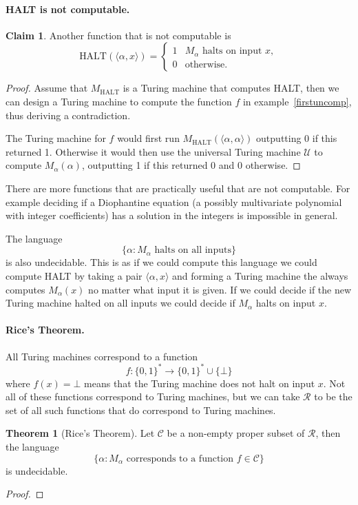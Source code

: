 \documentclass[11pt,a4paper]{article}
\theoremstyle{definition}
\newtheorem{thm}{Theorem}
\newtheorem{claim}{Claim}
\newcommand{\U}{\mathcal{U}}
\begin{document}
\paragraph{HALT is not computable.}
\begin{claim}
Another function that is not computable is
\[
\text{HALT}(\langle \alpha,x\rangle) =\begin{cases}
1 & M_\alpha \text{ halts on input }x,\\
0 &\text{otherwise}.
\end{cases}
\]
\end{claim}
\begin{proof}
Assume that $M_{\text{HALT}}$ is a Turing machine that computes HALT, then we can design a Turing machine to compute the function $f$ in example~\ref{firstuncomp}, thus deriving a contradiction.

The Turing machine for $f$ would first run $M_{\text{HALT}}(\langle \alpha,\alpha\rangle)$ outputting 0 if this returned 1.
Otherwise it would then use the universal Turing machine $\U$ to compute $M_\alpha (\alpha)$, outputting 1 if this returned 0 and 0 otherwise.
\end{proof}

There are more functions that are practically useful that are not computable.
For example deciding if a Diophantine equation (a possibly multivariate polynomial with integer coefficients) has a solution in the integers is impossible in general.

The language
\[
\{\alpha : M_{\alpha} \text{ halts on all inputs}\}
\]
is also undecidable.
This is as if we could compute this language we could compute HALT by taking a pair $\langle \alpha,x\rangle$ and forming a Turing machine the always computes $M_\alpha(x)$ no matter what input it is given.
If we could decide if the new Turing machine halted on all inputs we could decide if $M_\alpha$ halts on input $x$.

\paragraph{Rice's Theorem.}
All Turing machines correspond to a function
\[
f\colon\{0,1\}^*\to\{0,1\}^*\cup\{\bot\}
\]
where $f(x) = \bot$ means that the Turing machine does not halt on input $x$.
Not all of these functions correspond to Turing machines, but we can take $\mathcal{R}$ to be the set of all such functions that do correspond to Turing machines.

\begin{thm}[Rice's Theorem]
Let $\mathcal{C}$ be a non-empty proper subset of $\mathcal{R}$, then the language
\[
\{\alpha : M_\alpha \text{ corresponds to a function } f\in \mathcal{C}\}
\]
is undecidable.
\end{thm}
\begin{proof}
\end{proof}
\end{document}
